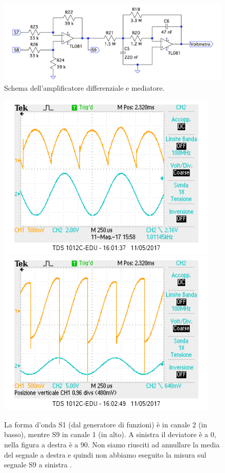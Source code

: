 \documentclass[10pt,a4paper]{article}
\begin{document}
\begin{figure}[!htb]
  \centering
  \includegraphics[scale=0.75]{amplificatorediff-mediatore.png}
\caption{Schema dell'amplificatore differenziale e mediatore.\label{fig:amplificatorediff-mediatore}}
\end{figure}

\begin{figure}[!htb]
  \centering
  \includegraphics[scale=0.45]{dev0ch1S9-ch2S1.png}\includegraphics[scale=0.45]{dev90ch1S9-ch2S1.png}
\caption{La forma d'onda S1 (dal generatore di funzioni) è in canale 2 (in basso), mentre S9 in canale 1 (in alto). A sinistra il deviatore è a 0\degree, nella figura a destra è a 90\degree. Non siamo riusciti ad annullare la media del segnale a destra e quindi non abbiamo eseguito la misura sul segnale S9 a sinistra . \label{osc:devS9}}
\end{figure}
\end{document}
